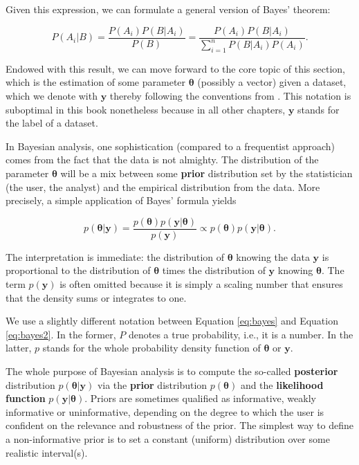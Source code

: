 Given this expression, we can formulate a general version of Bayes' theorem:

\begin{equation}
\label{eq:bayes}
P(A_i|B)=\frac{P(A_i)P(B|A_i)}{P(B)}= \frac{P(A_i)P(B|A_i)}{\sum_{i=1}^nP(B|A_i)P(A_i)}.
\end{equation}

Endowed with this result, we can move forward to the core topic of this section, which is the estimation of some parameter $\boldsymbol{\theta}$ (possibly a vector) given a dataset, which we denote with $\textbf{y}$ thereby following the conventions from \cite{gelman2013bayesian}. This notation is suboptimal in this book nonetheless because in all other chapters, $\textbf{y}$ stands for the label of a dataset.

In Bayesian analysis, one sophistication (compared to a frequentist approach) comes from the fact that the data is not almighty. The distribution of the parameter $\boldsymbol{\theta}$ will be a mix between some \textbf{prior} distribution set by the statistician (the user, the analyst) and the empirical distribution from the data. More precisely, a simple application of Bayes' formula yields

\begin{equation}
\label{eq:bayes2}
p(\boldsymbol{\theta}| \textbf{y})=\frac{p(\boldsymbol{\theta})p(\textbf{y} |\boldsymbol{\theta})}{p(\textbf{y})} \propto p(\boldsymbol{\theta})p(\textbf{y} |\boldsymbol{\theta}).
\end{equation}

The interpretation is immediate: the distribution of $\boldsymbol{\theta}$ knowing the data $\textbf{y}$ is proportional to the distribution of $\boldsymbol{\theta}$ times the distribution of $\textbf{y}$ knowing $\boldsymbol{\theta}$. The term $p(\textbf{y})$ is often omitted because it is simply a scaling number that ensures that the density sums or integrates to one.

We use a slightly different notation between Equation \ref{eq:bayes} and Equation \ref{eq:bayes2}. In the former, $P$ denotes a true probability, i.e., it is a number. In the latter, $p$ stands for the whole probability density function of $\boldsymbol{\theta}$ or $\textbf{y}$.

The whole purpose of Bayesian analysis is to compute the so-called \textbf{posterior} distribution $p(\boldsymbol{\theta}| \textbf{y})$ via the \textbf{prior} distribution $p(\boldsymbol{\theta})$ and the \textbf{likelihood function} $p(\textbf{y} |\boldsymbol{\theta})$. Priors are sometimes qualified as informative, weakly informative or uninformative, depending on the degree to which the user is confident on the relevance and robustness of the prior. The simplest way to define a non-informative prior is to set a constant (uniform) distribution over some realistic interval(s).

